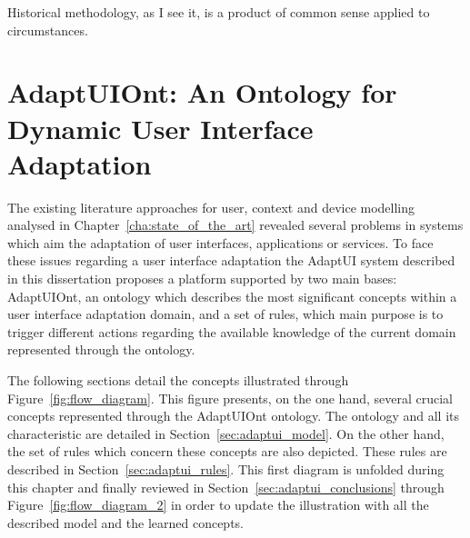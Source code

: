 
\begin{savequote}[50mm]
Historical methodology, as I see it, is a product of common sense applied to circumstances. 
\end{savequote}


\chapter{AdaptUIOnt: An Ontology for Dynamic User Interface Adaptation}
\label{cha:ontology_model}

\ifpdf
    \graphicspath{{3_ontology_model/figures/PNG/}{3_ontology_model/figures/PDF/}{3_ontology_model/figures/}}
\else
    \graphicspath{{3_ontology_model/figures/EPS/}{3_ontology_model/figures/}}
\fi

The existing literature approaches for user, context and device modelling
analysed in Chapter~\ref{cha:state_of_the_art} revealed several problems in
systems which aim the adaptation of user interfaces, applications or services.
To face these issues regarding a user interface adaptation the AdaptUI system
described in this dissertation proposes a platform supported by two main bases:
AdaptUIOnt, an ontology which describes the most significant concepts within a
user interface adaptation domain, and a set of rules, which main purpose is
to trigger different actions regarding the available knowledge of the current
domain represented through the ontology.

The following sections detail the concepts illustrated through Figure~\ref{fig:flow_diagram}.
This figure presents, on the one hand, several crucial concepts represented
through the AdaptUIOnt ontology. The ontology and all its characteristic are
detailed in Section~\ref{sec:adaptui_model}. On the other hand, the set of rules
which concern these concepts are also depicted. These rules are described in
Section~\ref{sec:adaptui_rules}. This first diagram is unfolded during this
chapter and finally reviewed in Section~\ref{sec:adaptui_conclusions} through
Figure~\ref{fig:flow_diagram_2} in order to update the illustration with all the
described model and the learned concepts.


